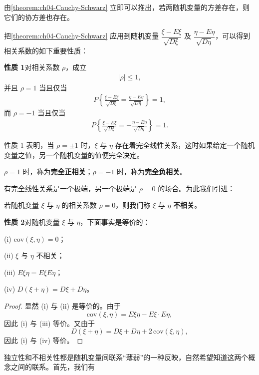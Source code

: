 \documentclass[../../main.tex]{subfiles}
\begin{document}
由\cref{theorem:ch04-Cauchy-Schwarz} 立即可以推出，若两随机变量的方差存在，则它们的协方差也存在。

把\cref{theorem:ch04-Cauchy-Schwarz} 应用到随机变量 $\dfrac{\xi-E\xi}{\sqrt{D\xi}}$ 及 $\dfrac{\eta-E\eta}{\sqrt{D\eta}}$，可以得到相关系数的如下重要性质：

\noindent\textbf{性质 1}\quad 对相关系数 $\rho$，成立
\begin{align}
|\rho|\leqslant 1,\label{align:ch04-rho模长}
\end{align}
并且 $\rho=1$ 当且仅当
\begin{align}
P\left\{\frac{\xi-E\xi}{\sqrt{D\xi}}=\frac{\eta-E\eta}{\sqrt{D\eta}}\right\}=1,\label{align:ch04-rho1}
\end{align}
而 $\rho=-1$ 当且仅当
\begin{align}
P\left\{\frac{\xi-E\xi}{\sqrt{D\xi}}=-\frac{\eta-E\eta}{\sqrt{D\eta}}\right\}=1.\label{align:ch04-rhom1}
\end{align}

性质 1 表明，当 $\rho=\pm 1$ 时，$\xi$ 与 $\eta$ 存在着完全线性关系，这时如果给定一个随机变量之值，另一个随机变量的值便完全决定。

$\rho=1$ 时，称为\textbf{完全正相关}；$\rho=-1$ 时，称为\textbf{完全负相关}。

有完全线性关系是一个极端，另一个极端是 $\rho=0$ 的场合。为此我们引进：

\begin{definition}[不相关]\label{definition:ch04-不相关}
若随机变量 $\xi$ 与 $\eta$ 的相关系数 $\rho=0$，则我们称 $\xi$ 与 $\eta$ \textbf{不相关}。
\end{definition}

\noindent\textbf{性质 2}\quad 对随机变量 $\xi$ 与 $\eta$，下面事实是等价的：

(i) $\mathrm{cov}(\xi,\eta)=0$；

(ii) $\xi$ 与 $\eta$ 不相关；

(iii) $E\xi\eta=E\xi E\eta$；

(iv) $D(\xi+\eta)=D\xi+D\eta$。

\begin{proof}
显然 (i) 与 (ii) 是等价的。由于
\[
\mathrm{cov}(\xi,\eta)=E\xi\eta-E\xi\cdot E\eta,
\]
因此 (i) 与 (iii) 等价。又由于
\[
D(\xi+\eta)=D\xi+D\eta+2\,\mathrm{cov}(\xi,\eta),
\]
因此 (i) 与 (iv) 等价。
\end{proof}

独立性和不相关性都是随机变量间联系``薄弱''的一种反映，自然希望知道这两个概念之间的联系。首先，我们有
\end{document}
